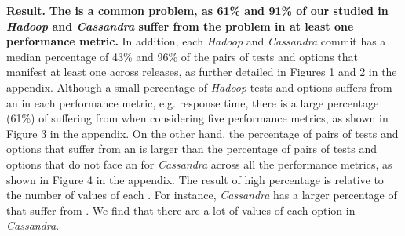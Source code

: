 \noindent \textbf{Result.}
\noindent \textbf{The \inconsistent is a common problem, as 61\% and 91\% of our studied \instance in \emph{Hadoop} and \emph{Cassandra} suffer from the \inconsistent problem in at least one performance metric.} In addition, each \emph{Hadoop} and \emph{Cassandra} commit has a median %
percentage of 43\% and 96\% of the pairs of tests and options that manifest at least one \inconsistent across releases, as further detailed in Figures 1 and 2 in the appendix. %
Although a small percentage of \emph{Hadoop} tests and options suffers from an \inconsistent in each performance metric, e.g. response time, there is a large percentage (61\%) of \instance suffering from \inconsistent when considering five performance metrics, as shown in Figure 3 in the appendix. %
On the other hand, the percentage of pairs of tests and options that suffer from an \inconsistent is larger than the percentage of pairs of tests and options that do not face an \inconsistent for \emph{Cassandra} across all the performance metrics, as shown in Figure 4 in the appendix. %
The result of high percentage is relative to the number of values of each \instance. For instance, \emph{Cassandra} has a larger percentage of \instance that suffer from \inconsistent. We find that there are a lot of values of each option in \emph{Cassandra}.  %


